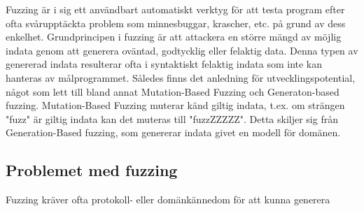 Fuzzing är i sig ett användbart automatiskt verktyg för att testa program efter
ofta svårupptäckta problem som minnesbuggar, krascher, etc. på grund av dess
enkelhet. Grundprincipen i fuzzing är att attackera en större mängd av möjlig
indata genom att generera oväntad, godtycklig eller felaktig data. Denna typen
av genererad indata resulterar ofta i syntaktiskt felaktig indata som inte kan
hanteras av målprogrammet. Således finns det anledning för utvecklingspotential,
något som lett till bland annat Mutation-Based Fuzzing och Generaton-based
fuzzing. Mutation-Based Fuzzing muterar känd giltig indata, t.ex. om strängen
"fuzz" är giltig indata kan det muteras till "fuzzZZZZZ". Detta skiljer sig från
Generation-Based fuzzing, som genererar indata givet en modell för domänen. 

\subsection{Problemet med fuzzing}
Fuzzing kräver ofta protokoll- eller domänkännedom för att kunna generera 




